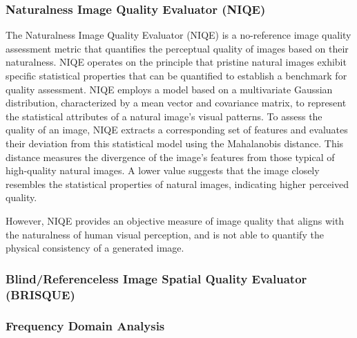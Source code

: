         

        \subsubsection{Naturalness Image Quality Evaluator (NIQE)}

        
            The Naturalness Image Quality Evaluator (NIQE) \cite{niqe} is a no-reference image quality assessment metric that quantifies the perceptual quality of images based on their naturalness.
            NIQE operates on the principle that pristine natural images exhibit specific statistical properties that can be quantified to establish a benchmark for quality assessment. 
            NIQE employs a model based on a multivariate Gaussian distribution, characterized by a mean vector and covariance matrix, to represent the statistical attributes of a natural image's visual patterns.
            To assess the quality of an image, NIQE extracts a corresponding set of features and evaluates their deviation from this statistical model using the Mahalanobis distance.
            This distance measures the divergence of the image's features from those typical of high-quality natural images.
            A lower value suggests that the image closely resembles the statistical properties of natural images, indicating higher perceived quality.
            
            However, NIQE provides an objective measure of image quality that aligns with the naturalness of human visual perception, and is not able to quantify the physical consistency of a generated image.
        \subsubsection{Blind/Referenceless Image Spatial Quality Evaluator (BRISQUE)}

        \subsubsection{Frequency Domain Analysis} \label{subsubsec:frequency_domain_analysis}
        

